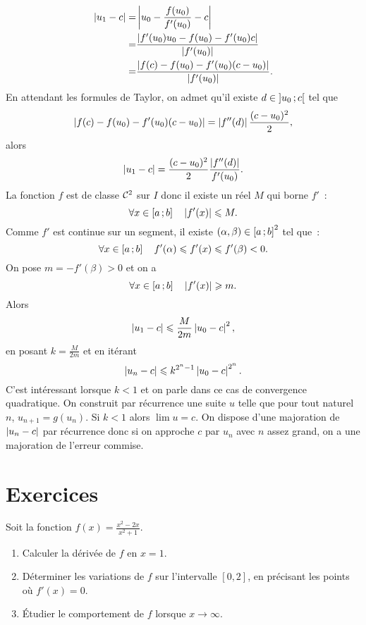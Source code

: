\begin{align*}
  \left\lvert u_1-c\right\rvert = & \left\lvert u_0 - \frac{f(u_0)}{f'(u_0)} -c\right\rvert \\
  = & \frac{\left\lvert f'(u_0)u_0 - f(u_0) -f'(u_0)c\right\rvert}{\left\lvert f'(u_0)\right\rvert} \\
  = & \frac{\left\lvert f(c)-f(u_0)-f'(u_0)(c-u_0)\right\rvert}{\left\lvert f'(u_0)\right\rvert}.
\end{align*}
En attendant les formules de Taylor, on admet qu'il existe \(d \in 
\left] u_0 \, ; {} c \right[\) tel que
\begin{equation}
  \left\lvert f(c)-f(u_0)-f'(u_0)(c-u_0)\right\rvert = \left\lvert f''(d)\right\rvert\frac{(c-u_0)^2}{2},
\end{equation}
alors
\begin{equation}
  \left\lvert u_1-c\right\rvert = \frac{(c-u_0)^2}{2} \frac{\left\lvert f''(d)\right\rvert}{f'(u_0)}.
\end{equation}
La fonction \(f\) est de classe \(\mathcal{C}^{2}\) sur \(I\) donc il existe un réel 
\(M\) qui borne \(f'\)~:
\begin{equation}
  \forall x \in \left[ a \, ; {} b \right] \quad \left\lvert f'(x)\right\rvert \leqslant M.
\end{equation}
Comme \(f'\) est continue sur un segment, il existe \((\alpha,\beta) \in 
\left[ a \, ; {} b \right]^2\) tel que~:
\begin{equation}
  \forall x \in \left[ a \, ; {} b \right] \quad f'(\alpha) \leqslant f'(x) \leqslant 
  f'(\beta) <0.
\end{equation}
On pose \(m=-f'(\beta)>0\) et on a
\begin{equation}
  \forall x \in \left[ a \, ; {} b \right] \quad \left\lvert f'(x)\right\rvert \geqslant m.
\end{equation}
Alors
\begin{equation}
  \left\lvert u_1-c\right\rvert \leqslant \frac{M}{2m} \left\lvert u_0-c\right\rvert^2,
\end{equation}
en posant \(k=\frac{M}{2m}\) et en itérant
\begin{equation}
  \left\lvert u_n-c\right\rvert \leqslant k^{2^n-1} \left\lvert u_0-c\right\rvert^{2^n}.
\end{equation}
C'est intéressant lorsque \(k < 1\) et on parle dans ce cas de convergence 
quadratique. On construit par récurrence une suite \(u\) telle que pour tout 
naturel \(n\), \(u_{n+1}=g(u_n)\). Si \(k<1\) alors \(\lim u =c\). On dispose 
d'une majoration de \(\left\lvert u_n-c\right\rvert\) par récurrence donc si on approche \(c\) par 
\(u_n\) avec \(n\) assez grand, on a une majoration de l'erreur commise.
\section{Exercices}
\begin{exercice}
Soit la fonction \( f(x) = \frac{x^2 - 2x}{x^2 + 1} \).
\begin{enumerate}
    \item Calculer la dérivée de \( f \) en \( x = 1 \).
    \item Déterminer les variations de \( f \) sur l'intervalle \( \left[ 0, 2 \right] \), en précisant les points où \( f'(x) = 0 \).
    \item Étudier le comportement de \( f \) lorsque \( x \to \infty \).
\end{enumerate}
\end{exercice}

